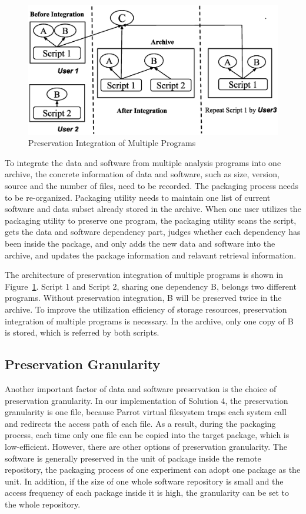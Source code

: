 \documentclass{sig-alternate}
\begin{document}
\begin{figure}
\centering
\includegraphics[width=1\columnwidth]{preservation-integration.eps}
\caption{Preservation Integration of Multiple Programs}
\label{fig:Preservation integration}
\end{figure}

To integrate the data and software from multiple analysis programs into one
archive, the concrete information of data and software, such as size, version,
source and the number of files, need to be recorded. 
The packaging
process needs to be re-organized. Packaging utility needs to maintain one list
of current software and data subset already stored in the archive. When one
user utilizes the packaging utility to preserve one program, the
packaging utility scans the script, gets the data and software dependency
part, judges whether each dependency has been inside the package, and only adds
the new data and software into the archive, and updates the package information
and relavant retrieval information.

The architecture of preservation integration of multiple programs is shown in
Figure~\ref{fig:Preservation integration}. Script 1 and Script 2, sharing one
dependency B, belongs two different programs. Without preservation
integration, B will be preserved twice in the archive. To improve the utilization efficiency of storage resources,
preservation integration of multiple programs is necessary. In the archive,
only one copy of B is stored, which is referred by both scripts.

\subsection{Preservation Granularity}

Another important factor of data and software preservation is the choice of
preservation granularity. In our implementation of Solution 4, the preservation granularity is one
file, because Parrot virtual filesystem traps each system call and redirects
the access path of each file. As a result, during the packaging process, each
time only one file can be copied into the target package, which is
low-efficient. However, there are other options of preservation granularity.
The software is generally preserved in the unit of package inside the remote
repository, the packaging process of one experiment can adopt one package as
the unit. In addition, if the size of one whole software repository is small
and the access frequency of each package inside it is high, the granularity can
be set to the whole repository.
\end{document}
